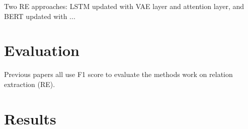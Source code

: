\documentclass[conference]{IEEEtran}
\begin{document}
Two RE approaches: LSTM\cite{yao2019docred} updated with VAE layer and attention layer, and BERT\cite{zeng2020double} updated with ...

\section{Evaluation}
Previous papers all use F1 score to evaluate the methods work on relation extraction (RE).

\section{Results}



\end{document}
